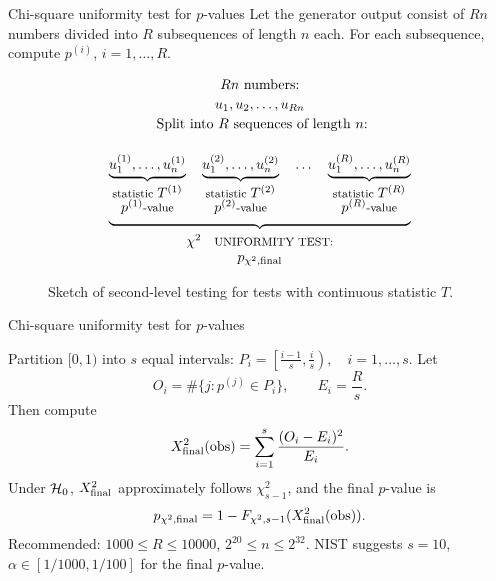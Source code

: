 \documentclass[aspectratio=169]{beamer}
\begin{document}
\begin{frame}{Chi-square uniformity test for $p$-values}
Let the generator output consist of $Rn$ numbers divided into $R$ subsequences of length $n$ each.
For each subsequence, compute $p^{(i)}$, $i=1,\ldots,R$.

\medskip

 \begin{figure}[h]
$$
\begin{array}{ccccc}
Rn \textrm{ numbers:} \\[2pt]
 u_1, u_2,\ldots, u_{Rn} \\[2pt]
 \textrm{ Split into } R \ \textrm{sequences of length } n \textrm{:} \\[15pt]
 \underbrace{
 \underbrace{u^{(1)}_1, \ldots, u^{(1)}_{n}}_{\footnotesize \textstyle \textrm{statistic } T^{(1)} \atop \footnotesize \textstyle p^{(1)}\textrm{-value}}
 \quad
 \underbrace{u^{(2)}_1, \ldots, u^{(2)}_{n}}_{\footnotesize \textstyle \textrm{statistic } T^{(2)} \atop \footnotesize \textstyle p^{(2)}\textrm{-value}}
 \quad
 \ldots
 \quad
 \underbrace{u^{(R)}_1, \ldots, u^{(R)}_{n}}_{\footnotesize \textstyle \textrm{statistic } T^{(R)} \atop {\footnotesize \textstyle p^{(R)}\textrm{-value} \atop \ }}
 }_{  \ \atop { {\small\textstyle \chi^2 \quad  \footnotesize \textstyle\textrm{UNIFORMITY TEST:}} }} \\
 p_{\chi^2,\textrm{final}}
\end{array}
$$
\caption{Sketch of second-level testing for tests with continuous statistic $T$.}\label{fig:second_level_testing}
\end{figure}
\end{frame}




\begin{frame}{Chi-square uniformity test for $p$-values}

Partition $[0,1)$ into $s$ equal intervals:
$ \displaystyle
P_i = \left[\frac{i-1}{s}, \frac{i}{s}\right), \quad i=1,\ldots,s.$
Let
\[
O_i = \#\{j : p^{(j)} \in P_i\}, \qquad E_i = \frac{R}{s}.
\]
Then compute
\[
X^2_{\rm final}(\text{obs}) = \sum_{i=1}^{s} \frac{(O_i - E_i)^2}{E_i}.
\]
Under ${\cal H}_0$, $X^2_{\rm final}$ approximately follows $\chi^2_{s-1}$,
and the final $p$-value is
\[
p_{\chi^2,\text{final}} = 1 - F_{\chi^2,s-1}(X^2_{\rm final}(\text{obs})).
\]
\medskip
\noindent
Recommended: $1000 \le R \le 10000$, $2^{20} \le n \le 2^{32}$.
NIST suggests $s=10$, $\alpha \in [1/1000, 1/100]$ for the final $p$-value.
\end{frame}
\end{document}
